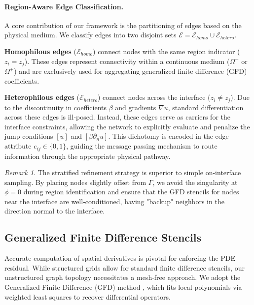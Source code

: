 \documentclass[11pt]{article}
\theoremstyle{definition}
\theoremstyle{remark}
\newtheorem{remark}{Remark}
\theoremstyle{plain}
\begin{document}
\paragraph{Region-Aware Edge Classification.}
A core contribution of our framework is the partitioning of edges based on the physical medium. We classify edges into two disjoint sets $\mathcal{E} = \mathcal{E}_{homo} \cup \mathcal{E}_{hetero}$.

\textbf{Homophilous edges} ($\mathcal{E}_{homo}$) connect nodes with the same region indicator ($z_i = z_j$). These edges represent connectivity within a continuous medium ($\Omega^-$ or $\Omega^+$) and are exclusively used for aggregating generalized finite difference (GFD) coefficients.

\textbf{Heterophilous edges} ($\mathcal{E}_{hetero}$) connect nodes across the interface ($z_i \neq z_j$). Due to the discontinuity in coefficients $\beta$ and gradients $\nabla u$, standard differentiation across these edges is ill-posed. Instead, these edges serve as carriers for the interface constraints, allowing the network to explicitly evaluate and penalize the jump conditions $[u]$ and $[\beta \partial_n u]$. This dichotomy is encoded in the edge attribute $e_{ij} \in \{0, 1\}$, guiding the message passing mechanism to route information through the appropriate physical pathway.

\begin{remark}
    The stratified refinement strategy is superior to simple on-interface sampling. By placing nodes slightly offset from $\Gamma$, we avoid the singularity at $\phi=0$ during region identification and ensure that the GFD stencils for nodes near the interface are well-conditioned, having "backup" neighbors in the direction normal to the interface.
\end{remark}

\subsection{Generalized Finite Difference Stencils}
\label{sec:gfd}

Accurate computation of spatial derivatives is pivotal for enforcing the PDE residual. While structured grids allow for standard finite difference stencils, our unstructured graph topology necessitates a mesh-free approach. We adopt the Generalized Finite Difference (GFD) method \cite{liszka1980finite, benito2001influence}, which fits local polynomials via weighted least squares to recover differential operators.
\end{document}
